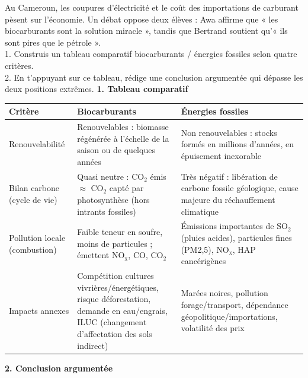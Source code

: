 \documentclass[11pt]{article}
\begin{document}
\begin{exoresolu}
Au Cameroun, les coupures d'électricité et le coût des importations de carburant pèsent sur l'économie. Un débat oppose deux élèves : Awa affirme que « les biocarburants sont la solution miracle », tandis que Bertrand soutient qu'« ils sont pires que le pétrole ».\\
1. Construis un tableau comparatif biocarburants / énergies fossiles selon quatre critères.\\
2. En t'appuyant sur ce tableau, rédige une conclusion argumentée qui dépasse les deux positions extrêmes.
\tcblower
\textbf{1. Tableau comparatif}

\begin{center}
\begin{tabularx}{\linewidth}{|l|X|X|}
\hline
\rowcolor{popblueL} Critère & Biocarburants & Énergies fossiles \\
\hline
Renouvelabilité & Renouvelables : biomasse régénérée à l'échelle de la saison ou de quelques années & Non renouvelables : stocks formés en millions d'années, en épuisement inexorable \\
\hline
Bilan carbone (cycle de vie) & Quasi neutre : $\mathrm{CO_2}$ émis $\approx$ $\mathrm{CO_2}$ capté par photosynthèse (hors intrants fossiles) & Très négatif : libération de carbone fossile géologique, cause majeure du réchauffement climatique \\
\hline
Pollution locale (combustion) & Faible teneur en soufre, moins de particules ; émettent $\mathrm{NO_x}$, $\mathrm{CO}$, $\mathrm{CO_2}$ & Émissions importantes de $\mathrm{SO_2}$ (pluies acides), particules fines (PM2,5), $\mathrm{NO_x}$, HAP cancérigènes \\
\hline
Impacts annexes & Compétition cultures vivrières/énergétiques, risque déforestation, demande en eau/engrais, ILUC (changement d'affectation des sols indirect) & Marées noires, pollution forage/transport, dépendance géopolitique/importations, volatilité des prix \\
\hline
\end{tabularx}
\end{center}

\textbf{2. Conclusion argumentée}


\end{exoresolu}
\end{document}
